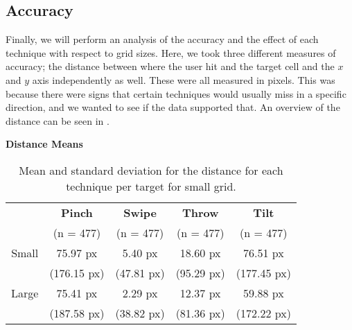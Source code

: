 \subsection{Accuracy}
Finally, we will perform an analysis of the accuracy and the effect of each technique with respect to grid sizes.
Here, we took three different measures of accuracy; the distance between where the user hit and the target cell and the $x$ and $y$ axis independently as well. 
These were all measured in pixels.
This was because there were signs that certain techniques would usually miss in a specific direction, and we wanted to see if the data supported that. 
An overview of the distance can be seen in .

\begin{table}[H]
	\centering
	\textbf{Distance Means}\\[4pt]
	\begin{adjustbox}{width=\columnwidth}
	\begin{tabular}{|c|c|c|c|c|}
		\hline
		\rowcolor[HTML]{9B9B9B} 
		& \textbf{Pinch} & \textbf{Swipe} & \textbf{Throw} & \textbf{Tilt} \\
		\rowcolor[HTML]{9B9B9B} 
		& (n = 477) & (n = 477) & (n = 477) & (n = 477) \\ \hline
		Small & 75.97 px & 5.40 px & 18.60 px  & 76.51 px         \\
		& (176.15 px) & (47.81 px) & (95.29 px) & (177.45 px) \\ \hline
		Large & 75.41 px & 2.29 px & 12.37 px & 59.88 px         \\
		& (187.58 px) & (38.82 px) & (81.36 px) & (172.22 px) \\ \hline
	\end{tabular}
	\end{adjustbox}
	\caption{Mean and standard deviation for the distance for each technique per target for small grid.}
	\label{tab:distance}
\end{table}

